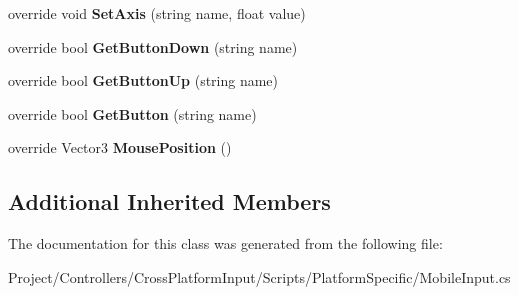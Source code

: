 \begin{DoxyCompactItemize}
\mbox{\label{class_unity_standard_assets_1_1_cross_platform_input_1_1_platform_specific_1_1_mobile_input_a62844904d698bdeb2a5305d3ddd1a3f0}} 
override void {\bfseries Set\+Axis} (string name, float value)
\item 
\mbox{\label{class_unity_standard_assets_1_1_cross_platform_input_1_1_platform_specific_1_1_mobile_input_a8bf6e39ee25d772a7ee72ab9ea04b50b}} 
override bool {\bfseries Get\+Button\+Down} (string name)
\item 
\mbox{\label{class_unity_standard_assets_1_1_cross_platform_input_1_1_platform_specific_1_1_mobile_input_aa8563558050d14bdec8b9e1ceae8464c}} 
override bool {\bfseries Get\+Button\+Up} (string name)
\item 
\mbox{\label{class_unity_standard_assets_1_1_cross_platform_input_1_1_platform_specific_1_1_mobile_input_a02d4acfbb8bac5f80d9d7ce07fd72dd0}} 
override bool {\bfseries Get\+Button} (string name)
\item 
\mbox{\label{class_unity_standard_assets_1_1_cross_platform_input_1_1_platform_specific_1_1_mobile_input_ab85ef8caaf3f7346d06f75c22cb98b73}} 
override Vector3 {\bfseries Mouse\+Position} ()
\end{DoxyCompactItemize}
\subsection*{Additional Inherited Members}


The documentation for this class was generated from the following file\+:\begin{DoxyCompactItemize}
\item 
Project/\+Controllers/\+Cross\+Platform\+Input/\+Scripts/\+Platform\+Specific/Mobile\+Input.\+cs\end{DoxyCompactItemize}
